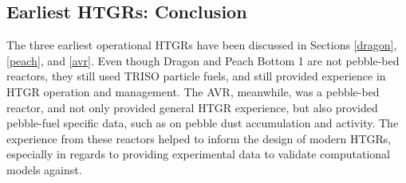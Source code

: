 


\subsection{Earliest HTGRs: Conclusion}

The three earliest operational HTGRs have been discussed in Sections \autoref{dragon}, \autoref{peach}, and \autoref{avr}.  Even though Dragon and Peach Bottom 1 are not pebble-bed reactors, they still used TRISO particle fuels, and still provided experience in HTGR operation and management.  The AVR, meanwhile, was a pebble-bed reactor, and not only provided general HTGR experience, but also provided pebble-fuel specific data, such as on pebble dust accumulation and activity.  The experience from these reactors helped to inform the design of modern HTGRs, especially in regards to providing experimental data to validate computational models against.